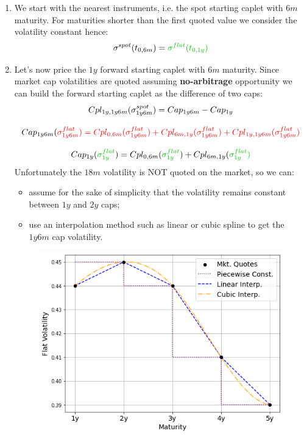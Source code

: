 \documentclass[12pt,a4paper]{article}
\begin{document}
\begin{enumerate}
\item We start with the nearest instruments, i.e. the spot starting caplet with $6m$ maturity. For maturities shorter than the first quoted value we consider the volatility constant hence:
\begin{equation}
\sigma^{spot}(t_{0,6m})=\color{ipython-green}{\sigma^{flat}(t_{0,1y})}
\end{equation}
\item Let’s now price the $1y$ forward starting caplet with $6m$ maturity. Since market cap volatilities are quoted assuming \textbf{no-arbitrage} opportunity we can build the forward starting caplet as the difference of two caps:
\begin{equation}
\begin{gathered}
Cpl_{1y, 1y6m}(\sigma^{spot}_{1y6m})=Cap_{1y6m}-Cap_{1y} \\[0.3cm]
Cap_{1y6m}(\color{red}{\sigma^{flat}_{1y6m}})=Cpl_{0,6m}(\color{red}{\sigma^{flat}_{1y6m}}) + Cpl_{6m,1y}(\color{red}{\sigma^{flat}_{1y6m}}) + Cpl_{1y,1y6m}(\color{red}{\sigma^{flat}_{1y6m}}) \\[0.3cm]
Cap_{1y}(\textcolor{ipython-green}{\sigma^{flat}_{1y}})=Cpl_{0,6m}(\textcolor{ipython-green}{\sigma^{flat}_{1y}}) + Cpl_{6m,1y}(\color{ipython-green}{\sigma^{flat}_{1y}}) 
\end{gathered}
\end{equation}
Unfortunately the $18m$ volatility is NOT quoted on the market, so we can:
\begin{itemize}
  \item assume for the sake of simplicity that the volatility remains constant between $1y$ and $2y$ caps;
  \item use an interpolation method such as linear or cubic spline to get the $1y6m$ cap volatility.
\end{itemize}

\begin{figure}[htbp]
\begin{center}
\includegraphics[width=0.6\linewidth]{addons/flat_volatilities}
\end{center}
\label{fig:flat_volatilities}
\end{figure}


\end{enumerate}
\end{document}
